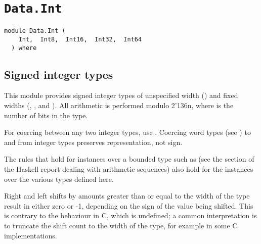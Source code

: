 \chapter{\texttt{Data.Int}}
\label{module:Data.Int}
\haddockbeginheader
{\haddockverb\begin{verbatim}
module Data.Int (
    Int,  Int8,  Int16,  Int32,  Int64
  ) where\end{verbatim}}
\haddockendheader

\section{Signed integer types
}
This module provides signed integer types of unspecified width ()
and fixed widths (, ,  and ).  All
arithmetic is performed modulo 2{\char '136}n, where  is the number of bits in
the type.
\par
For coercing between any two integer types, use
.  Coercing word types (see ) to and
from integer types preserves representation, not sign.
\par
The rules that hold for  instances over a bounded type
such as  (see the section of the Haskell report dealing with
arithmetic sequences) also hold for the  instances over
the various  types defined here.
\par
Right and left shifts by amounts greater than or equal to the width of
the type result in either zero or -1, depending on the sign of the
value being shifted.  This is contrary to the behaviour in C, which is
undefined; a common interpretation is to truncate the shift count to
the width of the type, for example  in some C
implementations.
\par

